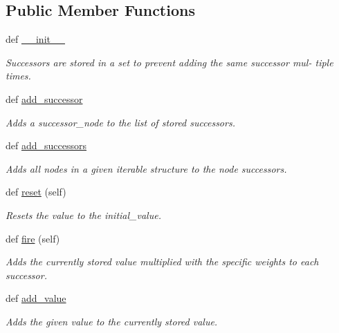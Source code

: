 \subsection*{Public Member Functions}
\begin{DoxyCompactItemize}
\item 
def \hyperlink{classNEAT__PyGenetics_1_1NEAT_1_1GenomeStructures_1_1SimulationStructure_1_1SimulationNodes_1_1Node_adc4a4683c2a06deaf2804d6f2745df3c}{\+\_\+\+\_\+init\+\_\+\+\_\+}
\begin{DoxyCompactList}\small\item\em Successors are stored in a set to prevent adding the same successor mul-\/ tiple times. \end{DoxyCompactList}\item 
def \hyperlink{classNEAT__PyGenetics_1_1NEAT_1_1GenomeStructures_1_1SimulationStructure_1_1SimulationNodes_1_1Node_a97ac70897d562bce07c8395c17fe2a1b}{add\+\_\+successor}
\begin{DoxyCompactList}\small\item\em Adds a successor\+\_\+node to the list of stored successors. \end{DoxyCompactList}\item 
def \hyperlink{classNEAT__PyGenetics_1_1NEAT_1_1GenomeStructures_1_1SimulationStructure_1_1SimulationNodes_1_1Node_a101dbc625ef502856902d623193e2901}{add\+\_\+successors}
\begin{DoxyCompactList}\small\item\em Adds all nodes in a given iterable structure to the node successors. \end{DoxyCompactList}\item 
def \hyperlink{classNEAT__PyGenetics_1_1NEAT_1_1GenomeStructures_1_1SimulationStructure_1_1SimulationNodes_1_1Node_ae2ad3e79c3b1a95bffd61b932f54f566}{reset} (self)
\begin{DoxyCompactList}\small\item\em Resets the value to the initial\+\_\+value. \end{DoxyCompactList}\item 
def \hyperlink{classNEAT__PyGenetics_1_1NEAT_1_1GenomeStructures_1_1SimulationStructure_1_1SimulationNodes_1_1Node_abc0a976efab6982a2630d01489554fde}{fire} (self)
\begin{DoxyCompactList}\small\item\em Adds the currently stored value multiplied with the specific weights to each successor. \end{DoxyCompactList}\item 
def \hyperlink{classNEAT__PyGenetics_1_1NEAT_1_1GenomeStructures_1_1SimulationStructure_1_1SimulationNodes_1_1Node_aecc180ca33b3e3acd7601a3ad3e63b7d}{add\+\_\+value}
\begin{DoxyCompactList}\small\item\em Adds the given value to the currently stored value. \end{DoxyCompactList}\end{DoxyCompactItemize}
